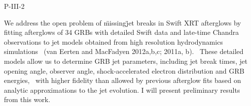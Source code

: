 P-III-2


\bigskip



\bigskip

\noindent We address the open problem of \"missing\" jet breaks in Swift XRT afterglows by fitting afterglows of 34 GRBs with detailed Swift data and late-time Chandra observations to jet models obtained from high resolution hydrodynamics simulations  (van Eerten and MacFadyen 2012a,b,c; 2011a, b).  These detailed models allow us to determine GRB jet parameters, including jet break times, jet opening angle, observer angle, shock-accelerated electron distribution and GRB energies,  with higher fidelity than allowed by previous afterglow fits based on analytic approximations to the jet evolution.  I will present preliminary results from this work.
